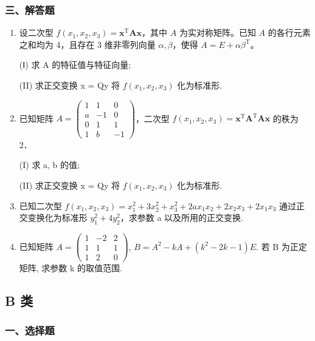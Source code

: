 \documentclass[12pt, a4paper]{ctexart}
\begin{document}
\subsubsection*{三、解答题}

\begin{enumerate}[start=22]
    \item 设二次型 $ f(x_1, x_2, x_3) = \mathbf{x}^\mathrm{T} \mathbf{A} \mathbf{x} $，其中 $ A $ 为实对称矩阵。已知 $ A $ 的各行元素之和均为 4，且存在 3 维非零列向量 $ \alpha, \beta $，使得 $ A = E + \alpha \beta^\mathrm{T} $。
    
    (Ⅰ) 求 A 的特征值与特征向量;
    
    (II) 求正交变换 x = Qy 将 $ f(x_{1}, x_{2}, x_{3}) $ 化为标准形.

    \item 已知矩阵 $ A = \begin{pmatrix} 1 & 1 & 0 \\ a & -1 & 0 \\ 0 & 1 & 1 \\ 1 & b & -1 \end{pmatrix} $，二次型 $ f(x_1, x_2, x_3) = \mathbf{x}^{\mathrm{T}} \mathbf{A}^{\mathrm{T}} \mathbf{A} \mathbf{x} $ 的秩为 2．
    
    (I) 求 a, b 的值;
    
    (II) 求正交变换 x = Qy 将 $ f(x_{1}, x_{2}, x_{3}) $ 化为标准形.

    \item 已知二次型 $ f(x_{1},x_{2},x_{3})=x_{1}^{2}+3x_{2}^{2}+x_{3}^{2}+2ax_{1}x_{2}+2x_{2}x_{3}+2x_{1}x_{3} $ 通过正交变换化为标准形 $ y_{1}^{2}+4y_{2}^{2} $，求参数 a 以及所用的正交变换.

    \item 已知矩阵 $ A = \begin{pmatrix} 1 & -2 & 2 \\ 1 & 1 & 1 \\ 1 & 2 & 0 \end{pmatrix} $, $ B = A^2 - kA + (k^2 - 2k - 1)E $. 若 B 为正定矩阵, 求参数 k 的取值范围.
\end{enumerate}

\subsection{B 类}

\subsubsection*{一、选择题}
\end{document}
